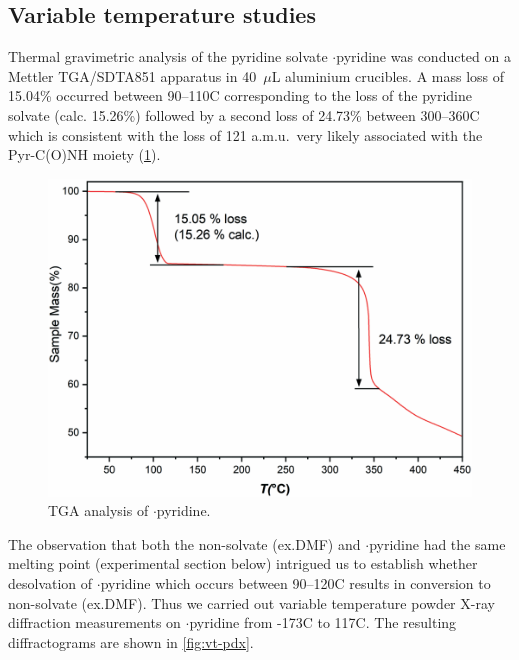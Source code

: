 \begin{refsection}
\subsection{Variable temperature studies}
Thermal gravimetric analysis of the pyridine solvate $\cdot$pyridine was conducted on a Mettler TGA/SDTA851 apparatus in 40~$\mu$L aluminium crucibles.
A mass loss of 15.04\% occurred between 90--110\degree{}C corresponding to the loss of the pyridine solvate (calc. 15.26\%) followed by a second loss of 24.73\% between 300--360\degree{}C which is consistent with the loss of 121 a.m.u.\ very likely associated with the Pyr-C(O)NH moiety (\cref{fig:tga}).

\begin{figure}
    \centering
    \includegraphics[width=0.8\linewidth]{Figures/tga.pdf}
    \caption{TGA analysis of $\cdot$pyridine.}\label{fig:tga}
\end{figure}

The observation that both the non-solvate (ex.DMF) and $\cdot$pyridine had the same melting point (experimental section below) intrigued us to establish whether desolvation of $\cdot$pyridine which occurs between 90--120\degree{}C results in conversion to non-solvate (ex.DMF).
Thus we carried out variable temperature powder X-ray diffraction measurements on $\cdot$pyridine from -173\degree{}C to 117\degree{}C.
The resulting diffractograms are shown in \cref{fig:vt-pdx}.


\end{refsection}
